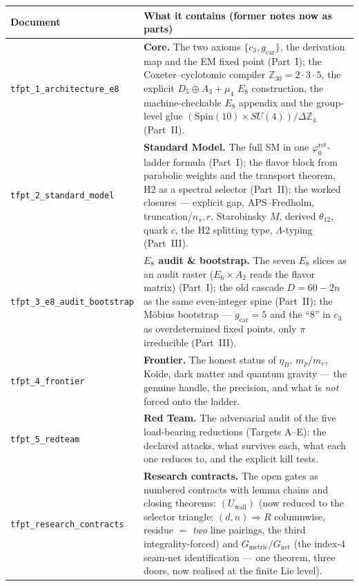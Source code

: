 \documentclass[11pt,a4paper]{article}
\newcommand{\cthree}{c_3}
\newcommand{\gcar}{g_{\mathrm{car}}}
\newcommand{\phiz}{\varphi_0^{\mathrm{ret}}}
\newcommand{\Z}{\mathbb{Z}}
\begin{document}
\begin{center}\scriptsize
\renewcommand{\arraystretch}{1.25}
\begin{tabularx}{\linewidth}{@{}p{3.6cm}Y@{}}
\toprule
\textbf{Document} & \textbf{What it contains (former notes now as parts)} \\
\midrule
\texttt{tfpt\_1\_architecture\_e8} & \textbf{Core.} The two axioms $\{\cthree,\gcar\}$, the derivation map and the EM fixed point (Part~I); the Coxeter--cyclotomic compiler $\Z_{30}{=}2{\cdot}3{\cdot}5$, the explicit $D_5{\oplus}A_3{+}\mu_4$ $E_8$ construction, the machine-checkable $E_8$ appendix and the group-level glue $(\mathrm{Spin}(10){\times}SU(4))/\Delta\Z_4$ (Part~II). \\
\texttt{tfpt\_2\_standard\_model} & \textbf{Standard Model.} The full SM in one $\phiz$-ladder formula (Part~I); the flavor block from parabolic weights and the transport theorem, H2 as a spectral selector (Part~II); the worked closures --- explicit gap, APS--Fredholm, truncation/$n_s,r$, Starobinsky $M$, derived $\theta_{12}$, quark $c$, the H2 splitting type, $\Lambda$-typing (Part~III). \\
\texttt{tfpt\_3\_e8\_audit\_bootstrap} & \textbf{$E_8$ audit \& bootstrap.} The seven $E_8$ slices as an audit raster ($E_6{\times}A_2$ reads the flavor matrix) (Part~I); the old cascade $D{=}60{-}2n$ as the same even-integer spine (Part~II); the M\"obius bootstrap --- $\gcar{=}5$ and the ``$8$'' in $\cthree$ as overdetermined fixed points, only $\pi$ irreducible (Part~III). \\
\texttt{tfpt\_4\_frontier} & \textbf{Frontier.} The honest status of $\eta_B$, $m_p/m_e$, Koide, dark matter and quantum gravity --- the genuine handle, the precision, and what is \emph{not} forced onto the ladder. \\
\texttt{tfpt\_5\_redteam} & \textbf{Red Team.} The adversarial audit of the five load-bearing reductions (Targets A--E): the declared attacks, what survives each, what each one reduces to, and the explicit kill tests. \\
\texttt{tfpt\_research\_contracts} & \textbf{Research contracts.} The open gates as numbered contracts with lemma chains and closing theorems: $(U_{\mathrm{wall}})$ (now reduced to the selector triangle: $(d,n)\Rightarrow R$ columnwise, residue $=$ \emph{two} line pairings, the third integrality-forced) and $G_{\mathrm{metric}}/G_{\mathrm{net}}$ (the index-$4$ seam-net identification --- one theorem, three doors, now realised at the finite Lie level). \\

\end{tabularx}
\end{center}
\end{document}
